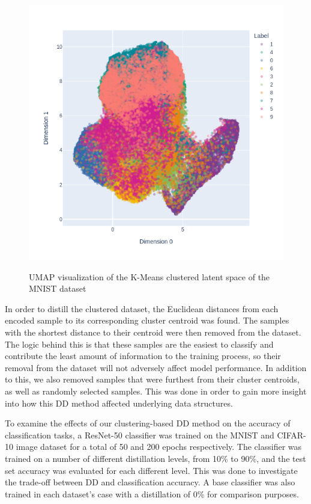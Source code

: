\begin{figure}
    \centering
    \caption{UMAP visualization of the K-Means clustered latent space of the MNIST dataset}
    \includegraphics[width=1\linewidth]{fig_datadistill/newplot.png}
    \label{fig:umap-mnist}
\end{figure}

In order to distill the clustered dataset, the Euclidean distances from each encoded sample to its corresponding cluster centroid was found. The samples with the shortest distance to their centroid were then removed from the dataset. The logic behind this is that these samples are the easiest to classify and contribute the least amount of information to the training process, so their removal from the dataset will not adversely affect model performance. In addition to this, we also removed samples that were furthest from their cluster centroids, as well as randomly selected samples. This was done in order to gain more insight into how this DD method affected underlying data structures.

To examine the effects of our clustering-based DD method on the accuracy of classification tasks, a ResNet-50 classifier was trained on the MNIST and CIFAR-10 image dataset for a total of 50 and 200 epochs respectively. The classifier was trained on a number of different distillation levels, from 10\% to 90\%, and the test set accuracy was evaluated for each different level. This was done to investigate the trade-off between DD and classification accuracy. A base classifier was also trained in each dataset's case with a distillation of 0\% for comparison purposes.

